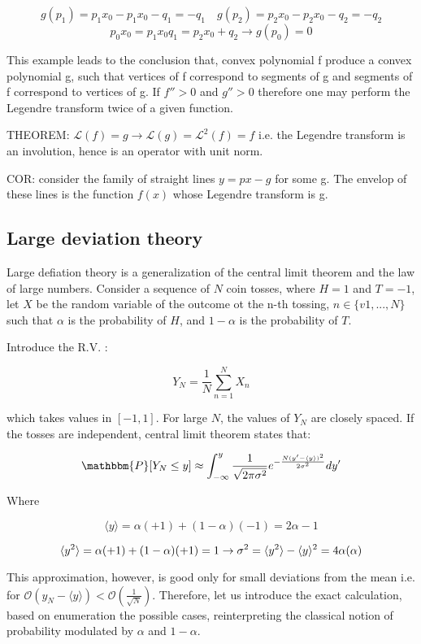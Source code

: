 \documentclass{article}
\begin{document}
$$g(p_1) = p_1 x_0 - p_1 x_0 - q_1 = - q_1  \quad g(p_2) = p_2 x_0 - p_2 x_0 - q_2 = - q_2 $$
$$ p_0 x_0 = p_1 x_0 q_1 = p_2 x_0 + q_2 \rightarrow g(p_0)=0$$

This example leads to the conclusion that, convex polynomial f produce a convex polynomial g, such that vertices of f correspond to segments of g and segments of f correspond to vertices of g.
If $f''>0$ and $g''>0$ therefore one may perform the Legendre transform twice of a given function.

THEOREM: 
$\mathcal{L}(f) = g \rightarrow \mathcal{L}(g) = \mathcal{L}^2(f)=f$ i.e. the Legendre transform is an involution, hence is an operator with unit norm.

COR: consider the family of straight lines $y=px-g$ for some g. The envelop of these lines is the function $f(x)$ whose Legendre transform is g.

\subsection{Large deviation theory}

Large defiation theory is a generalization of the central limit theorem and the law of large numbers.
Consider a sequence of $N$ coin tosses, where $H=1$ and $T=-1$, let $X$ be the random variable of the outcome ot the n-th tossing, $ n \in \{v1,...,N \}$ such that $\alpha$ is the probability of $H$, and $1-\alpha$ is the probability of $T$.

Introduce the R.V. :

$$Y_N = \frac{1}{N} \sum_{n=1}^{N} X_n$$

which takes values in $[-1,1]$. For large $N$, the values of $Y_N$ are closely spaced. If the tosses are independent, central limit theorem states that:

$$\mathbbm{P}[Y_N \leq y] \approx \int_{-\infty}^{y} \frac{1}{\sqrt{2 \pi \sigma^2}} e^{-\frac{N(y'-\langle y \rangle)^2}{2 \sigma^2}} dy'$$

Where 

$$\langle y \rangle = \alpha (+1) + (1-\alpha)(-1) = 2 \alpha -1$$

$$\langle y^2 \rangle =  \alpha (+1) + (1-\alpha)(+1) = 1 \rightarrow \sigma^2 = \langle y^2 \rangle - \langle y \rangle^2 = 4 \alpha (\-\alpha)  $$

This approximation, however, is good only for small deviations from the mean i.e. for $ \mathcal{O} (y_N - \langle y \rangle ) < \mathcal{O}(\frac{1}{\sqrt{N}} )$. Therefore, let us introduce the exact calculation, based on enumeration the possible cases, reinterpreting the classical notion of probability modulated by $\alpha$ and $1-\alpha$.
\end{document}
